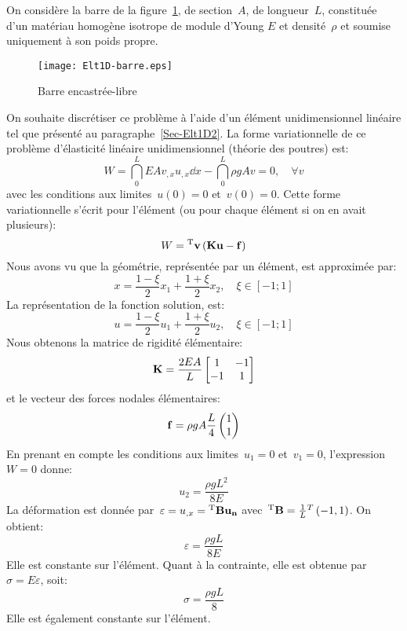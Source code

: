 On considère la barre de la figure~\ref{fig-barre}, de section~$A$, de longueur~$L$,  constituée d'un matériau homogène isotrope de module d'Young $E$ et densité~$\rho$ et soumise uniquement à son poids propre.
\begin{figure}[h!]
\centering
\texttt{[image: Elt1D-barre.eps]}
\caption{Barre encastrée-libre}\label{fig-barre}
\end{figure}
On souhaite discrétiser ce problème à l'aide d'un élément unidimensionnel linéaire
tel que présenté au paragraphe~\ref{Sec-Elt1D2}.
\medskipvm
La forme variationnelle de ce problème d'élasticité linéaire unidimensionnel (théorie des poutres) est:
\begin{equation}
W=\dint_0^L EA v_{,x}u_{,x} \dd x - \dint_0^L \rho g A v = 0, \quad \forall v
\end{equation}
avec les conditions aux limites~$u(0)=0$ et~$v(0)=0$.
Cette forme variationnelle s'écrit pour l'élément (ou pour chaque élément si on en avait plusieurs):
\begin{equation}
W = \LL{v} \left( \MM{K}\VV{u} - \VV{f} \right)
\end{equation}
\medskipvm
Nous avons vu que la géométrie, représentée par un élément, est approximée par:
\begin{equation} x=\frac{1-\xi}2 x_1 + \frac{1+\xi}2 x_2, \quad \xi\in[-1;1] \end{equation}
La représentation de la fonction solution, est:
\begin{equation} u = \frac{1-\xi}2 u_1 + \frac{1+\xi}2 u_2, \quad \xi\in[-1;1] \end{equation}
\medskipvm
Nous obtenons la matrice de rigidité élémentaire:
\begin{equation} 
\MM{K} = \frac{2EA}L \MM*{1 & -1\\ -1& 1}
\end{equation}
et le vecteur des forces nodales élémentaires:
\begin{equation} 
\VV{f} = \rho g A \frac{L}4 \VV*{1 \\1}
\end{equation}
\medskipvm
En prenant en compte les conditions aux limites~$u_1=0$ et~$v_1=0$, l'expression~$W=0$ donne:
\begin{equation} u_2 = \frac{\rho g L^2}{8 E} \end{equation}
\medskipvm
La déformation est donnée par~$\varepsilon=u_{,x}=\LL{B}\VV{u_n}$ avec~${}^\mathrm{T}\mathbf{B}=\frac1L {}^T\left( -1, 1\right)$.
On obtient:
\begin{equation}
\varepsilon=\frac{\rho g L}{8 E}
\end{equation} 
Elle est constante sur l'élément. Quant à la contrainte, elle est obtenue par~$\sigma=E\varepsilon$, soit:
\begin{equation}\sigma=\frac{\rho g L}8\end{equation}
Elle est également constante sur l'élément.

